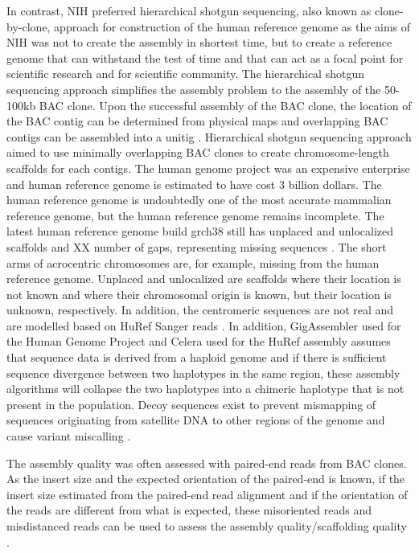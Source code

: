 In contrast, NIH preferred hierarchical shotgun sequencing, also known as clone-by-clone, approach for construction of the human reference genome as the aims of NIH was not to create the assembly in shortest time, but to create a reference genome that can withstand the test of time and that can act as a focal point for scientific research and for scientific community. The hierarchical shotgun sequencing approach simplifies the assembly problem to the assembly of the 50-100kb BAC clone. Upon the successful assembly of the BAC clone, the location of the BAC contig can be determined from physical maps and overlapping BAC contigs can be assembled into a unitig \cite{}. Hierarchical shotgun sequencing approach aimed to use minimally overlapping BAC clones to create chromosome-length scaffolds for each contigs. The human genome project was an expensive enterprise and human reference genome is estimated to have cost 3 billion dollars.  The human reference genome is undoubtedly one of the most accurate mammalian reference genome, but the human reference genome remains incomplete. The latest human reference genome build grch38 still has unplaced and unlocalized scaffolds and XX number of gaps, representing missing sequences \cite{}. The short arms of acrocentric chromosomes are, for example, missing from the human reference genome. Unplaced and unlocalized are scaffolds where their location is not known and where their chromosomal origin is known, but their location is unknown, respectively. In addition, the centromeric sequences are not real and are modelled based on HuRef Sanger reads \cite{}. In addition, GigAssembler used for the Human Genome Project and Celera used for the HuRef assembly assumes that sequence data is derived from a haploid genome and if there is sufficient sequence divergence between two haplotypes in the same region, these assembly algorithms will collapse the two haplotypes into a chimeric haplotype that is not present in the population. Decoy sequences exist to prevent mismapping of sequences originating from satellite DNA to other regions of the genome and cause variant miscalling \cite{}. 

The assembly quality was often assessed with paired-end reads from BAC clones. As the insert size and the expected orientation of the paired-end is known, if the insert size estimated from the paired-end read alignment and if the orientation of the reads are different from what is expected, these misoriented reads and misdistanced reads can be used to assess the assembly quality/scaffolding quality \cite{}. 

